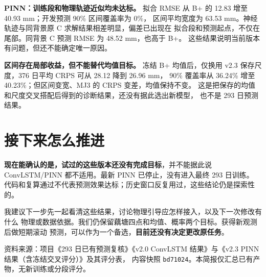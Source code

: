 \documentclass[UTF8,zihao=-4]{ctexart}
\begin{document}
\textbf{PINN：训练段和物理轨迹近似均未达标。}
拟合 RMSE 从 B+ 的 12.83 增至 40.93 mm；开发预测 90\% 区间覆盖率为 0\%，
区间平均宽度为 63.53 mm。神经轨迹与同背景原 C 求解结果相差明显，偏差已出现在
拟合段和预测起点，不仅在尾部。同背景 C 预测 RMSE 为 48.52 mm，也高于 B+。
这些结果说明当前版本有问题，但还不能确定唯一原因。

\textbf{区间存在局部收益，但不能替代均值目标。}
冻结 B+ 均值后，仅换用 v2.3 保存尺度，376 日平均 CRPS 可从 28.12 降到 26.96 mm，
90\% 覆盖率从 36.24\% 增至 40.23\%；但区间变宽、MJ3 的 CRPS 变差，均值保持不变。
这是把保存的均值和尺度交叉搭配后得到的诊断结果，还没有据此选出新模型，
也不是 293 日预测结果。

\section{接下来怎么推进}

\textbf{现在能确认的是，试过的这些版本还没有完成目标}，并不能据此说
ConvLSTM/PINN 都不适用。最新 PINN 已停止，没有进入最终 293 日训练。
代码和复算通过不代表预测效果达标；历史窗口反复用过，这些结论仍是探索性的。

我建议下一步先一起看清这些结果，讨论物理引导应怎样接入，以及下一次修改有什么
物理或数据依据。我们仍保留藕塘四点和均值、概率两个目标。获得新观测后做短期滚动
预测，可以作为一个备选，\textbf{目前还没有决定更改原任务}。

\vfill
{\footnotesize
\noindent 资料来源：项目《293 日已有预测复核》《v2.0 ConvLSTM 结果》与《v2.3 PINN 结果（含冻结交叉评分）》及其评分表，
内容快照 \texttt{bd71024}。本简报仅汇总已有产物，无新训练或分段评分。
}
\end{document}
